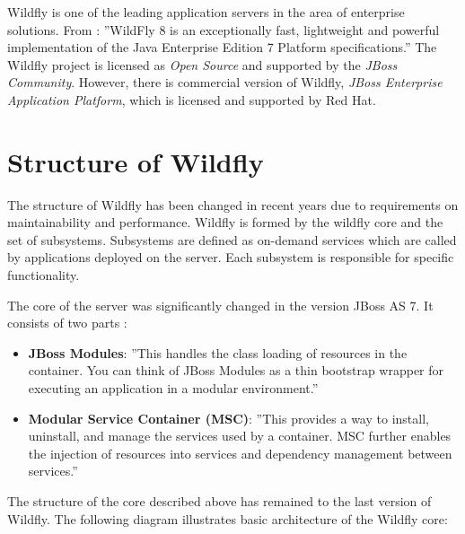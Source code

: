 \documentclass[12pt,oneside]{fithesis2}
\begin{document}
Wildfly is one of the leading application servers in the area of enterprise solutions. From \cite[Getting Started with WildFly 8]{wildfly_doc}: ''WildFly 8 is an exceptionally fast, lightweight and powerful implementation of the Java Enterprise Edition 7 Platform specifications.'' The Wildfly project is licensed as \textit{Open Source} and supported by the \textit{JBoss Community}. However, there is commercial version of Wildfly, \textit{JBoss Enterprise Application Platform}, which is licensed and supported by Red Hat.

\section{Structure of Wildfly}
The structure of Wildfly has been changed in recent years due to requirements on maintainability and performance. Wildfly is formed by the wildfly core and the set of subsystems. Subsystems are defined as on-demand services which are called by applications deployed on the server. Each subsystem is responsible for specific functionality.

The core of the server was significantly changed in the version JBoss AS 7. It consists of two parts \cite{jboss_as_book}:

\begin{itemize}
	\item \textbf{JBoss Modules}: ''This handles the class loading of resources in the container.
	You can think of JBoss Modules as a thin bootstrap wrapper for executing
	an application in a modular environment.''
	\item \textbf{Modular Service Container (MSC)}: ''This provides a way to install,
	uninstall, and manage the services used by a container. MSC further
	enables the injection of resources into services and dependency
	management between services.''
\end{itemize}

The structure of the core described above has remained to the last version of Wildfly. The following diagram illustrates basic architecture of the Wildfly core:
\end{document}
